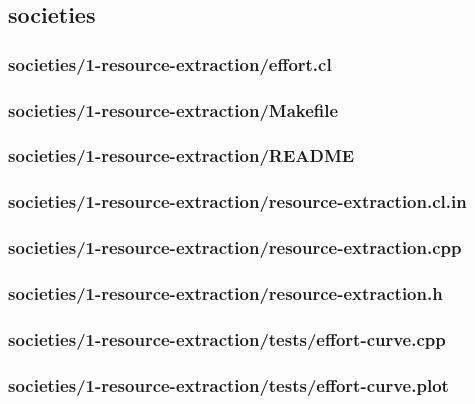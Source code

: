 \documentclass{article}
\begin{document}
\subsection{societies}
\subsubsection*{societies/1-resource-extraction/effort.cl}


\subsubsection*{societies/1-resource-extraction/Makefile}


\subsubsection*{societies/1-resource-extraction/README}


\subsubsection*{societies/1-resource-extraction/resource-extraction.cl.in}


\subsubsection*{societies/1-resource-extraction/resource-extraction.cpp}


\subsubsection*{societies/1-resource-extraction/resource-extraction.h}


\subsubsection*{societies/1-resource-extraction/tests/effort-curve.cpp}


\subsubsection*{societies/1-resource-extraction/tests/effort-curve.plot}

\end{document}
